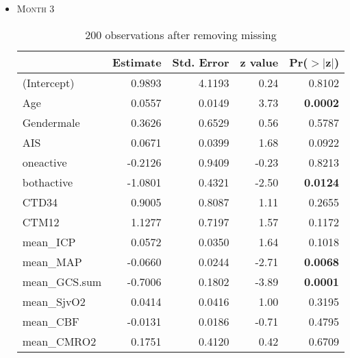 \documentclass{article}
\begin{document}
\begin{itemize}
\item \textsc{Month 3}
\begin{table}[H]
\caption{200 observations after removing missing}
\centering
\begin{tabular}{lrrrr}
  \hline
 & Estimate & Std. Error & z value & Pr($>$$|$z$|$) \\ 
  \hline
(Intercept) & 0.9893 & 4.1193 & 0.24 & 0.8102 \\ 
  Age & 0.0557 & 0.0149 & 3.73 & {\bf 0.0002} \\ 
  Gendermale & 0.3626 & 0.6529 & 0.56 & 0.5787 \\ 
  AIS & 0.0671 & 0.0399 & 1.68 & 0.0922 \\ 
  oneactive & -0.2126 & 0.9409 & -0.23 & 0.8213 \\ 
  bothactive & -1.0801 & 0.4321 & -2.50 & {\bf 0.0124} \\ 
  CTD34 & 0.9005 & 0.8087 & 1.11 & 0.2655 \\ 
  CTM12 & 1.1277 & 0.7197 & 1.57 & 0.1172 \\ 
  mean\_ICP & 0.0572 & 0.0350 & 1.64 & 0.1018 \\ 
  mean\_MAP & -0.0660 & 0.0244 & -2.71 & {\bf 0.0068} \\ 
  mean\_GCS.sum & -0.7006 & 0.1802 & -3.89 & {\bf 0.0001} \\ 
  mean\_SjvO2 & 0.0414 & 0.0416 & 1.00 & 0.3195 \\ 
  mean\_CBF & -0.0131 & 0.0186 & -0.71 & 0.4795 \\ 
  mean\_CMRO2 & 0.1751 & 0.4120 & 0.42 & 0.6709 \\ 
   \hline
\end{tabular}
\end{table}


\end{itemize}
\end{document}
